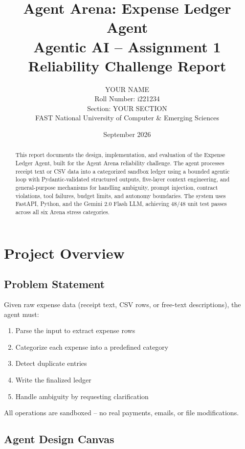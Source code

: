\documentclass[12pt,a4paper]{article}
\title{%
  \textbf{Agent Arena: Expense Ledger Agent} \\[0.5em]
  \large Agentic AI -- Assignment 1 \\[0.3em]
  \large Reliability Challenge Report
}
\author{
  YOUR NAME \\
  Roll Number: i221234 \\
  Section: YOUR SECTION \\
  FAST National University of Computer \& Emerging Sciences
}
\date{September 2026}
\begin{document}
\maketitle
\thispagestyle{empty}

\begin{abstract}
This report documents the design, implementation, and evaluation of the Expense Ledger Agent, built for the Agent Arena reliability challenge. The agent processes receipt text or CSV data into a categorized sandbox ledger using a bounded agentic loop with Pydantic-validated structured outputs, five-layer context engineering, and general-purpose mechanisms for handling ambiguity, prompt injection, contract violations, tool failures, budget limits, and autonomy boundaries. The system uses FastAPI, Python, and the Gemini 2.0 Flash LLM, achieving 48/48 unit test passes across all six Arena stress categories.
\end{abstract}

\tableofcontents
\newpage

\section{Project Overview}

\subsection{Problem Statement}
Given raw expense data (receipt text, CSV rows, or free-text descriptions), the agent must:
\begin{enumerate}
  \item Parse the input to extract expense rows
  \item Categorize each expense into a predefined category
  \item Detect duplicate entries
  \item Write the finalized ledger
  \item Handle ambiguity by requesting clarification
\end{enumerate}

All operations are sandboxed -- no real payments, emails, or file modifications.

\subsection{Agent Design Canvas}
\end{document}
